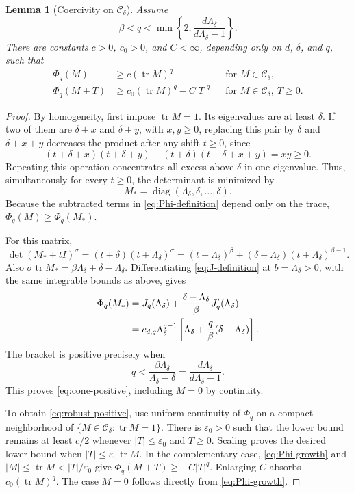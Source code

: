 \documentclass[11pt,a4paper,reqno]{amsart}
\theoremstyle{plain}
\newtheorem{lemma}[theorem]{Lemma}
\theoremstyle{remark}
\numberwithin{equation}{section}
\newcommand{\Cdelta}{\mathcal C_\delta}
\newcommand{\lam}{\Lambda_\delta}
\DeclareMathOperator{\tr}{tr}
\DeclareMathOperator{\diag}{diag}
\begin{document}
\begin{lemma}[Coercivity on $\Cdelta$]\label{lem:coercivity}
Assume
\begin{equation}\label{eq:cone-q-range}
 \beta<q<\min\left\{2,\frac{d\lam}{d\lam-1}\right\}.
\end{equation}
There are constants $c>0$, $c_0>0$, and $C<\infty$, depending only on $d$, $\delta$, and $q$, such that
\begin{align}
 \Phi_q(M)&\ge c(\tr M)^q &&\text{for }M\in\Cdelta,\label{eq:cone-positive}\\
 \Phi_q(M+T)&\ge c_0(\tr M)^q-C|T|^q
 &&\text{for }M\in\Cdelta,\ T\ge0.\label{eq:robust-positive}
\end{align}
\end{lemma}
\begin{proof}
By homogeneity, first impose $\tr M=1$. Its eigenvalues are at least $\delta$. If two of them are $\delta+x$ and $\delta+y$, with $x,y\ge0$, replacing this pair by $\delta$ and $\delta+x+y$ decreases the product after any shift $t\ge0$, since
\[
 (t+\delta+x)(t+\delta+y)
 -(t+\delta)(t+\delta+x+y)=xy\ge0.
\]
Repeating this operation concentrates all excess above $\delta$ in one eigenvalue. Thus, simultaneously for every $t\ge0$, the determinant is minimized by
\[
 M_* =\diag(\lam,\delta,\ldots,\delta).
\]
Because the subtracted terms in \eqref{eq:Phi-definition} depend only on the trace, $\Phi_q(M)\ge\Phi_q(M_*)$.

For this matrix,
\[
 \det(M_*+tI)^\sigma
 =(t+\delta)(t+\lam)^\sigma
 =(t+\lam)^\beta+(\delta-\lam)(t+\lam)^{\beta-1}.
\]
Also $\sigma\tr M_*=\beta\lam+\delta-\lam$. Differentiating \eqref{eq:J-definition} at $b=\lam>0$, with the same integrable bounds as above, gives
\begin{align}
 \Phi_q(M_*)
 &=J_q(\lam)+\frac{\delta-\lam}{\beta}J_q'(\lam)\notag\\
 &=c_{d,q}\lam^{q-1}
     \left[\lam+\frac q\beta(\delta-\lam)\right].\label{eq:extreme-Phi}
\end{align}
The bracket is positive precisely when
\[
 q<\frac{\beta\lam}{\lam-\delta}
   =\frac{d\lam}{d\lam-1}.
\]
This proves \eqref{eq:cone-positive}, including $M=0$ by continuity.

To obtain \eqref{eq:robust-positive}, use uniform continuity of $\Phi_q$ on a compact neighborhood of $\{M\in\Cdelta:\tr M=1\}$. There is $\varepsilon_0>0$ such that the lower bound remains at least $c/2$ whenever $|T|\le\varepsilon_0$ and $T\ge0$. Scaling proves the desired lower bound when $|T|\le\varepsilon_0\tr M$. In the complementary case, \eqref{eq:Phi-growth} and $|M|\le\tr M<|T|/\varepsilon_0$ give $\Phi_q(M+T)\ge-C|T|^q$. Enlarging $C$ absorbs $c_0(\tr M)^q$. The case $M=0$ follows directly from \eqref{eq:Phi-growth}.
\end{proof}
\end{document}
